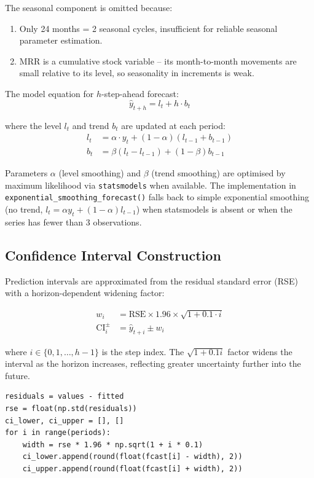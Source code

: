 The seasonal component is omitted because:
\begin{enumerate}
  \item Only 24 months = 2 seasonal cycles, insufficient for reliable seasonal parameter estimation.
  \item MRR is a cumulative stock variable -- its month-to-month movements are small relative to its level, so seasonality in increments is weak.
\end{enumerate}

The model equation for $h$-step-ahead forecast:
\begin{equation}
  \hat{y}_{t+h} = l_t + h \cdot b_t
\end{equation}

where the level $l_t$ and trend $b_t$ are updated at each period:
\begin{align}
  l_t &= \alpha \cdot y_t + (1 - \alpha)(l_{t-1} + b_{t-1}) \\
  b_t &= \beta(l_t - l_{t-1}) + (1 - \beta) b_{t-1}
\end{align}

Parameters $\alpha$ (level smoothing) and $\beta$ (trend smoothing) are optimised by maximum likelihood via \texttt{statsmodels} when available. The implementation in \texttt{exponential\_smoothing\_forecast()} falls back to simple exponential smoothing (no trend, $l_t = \alpha y_t + (1-\alpha) l_{t-1}$) when statsmodels is absent or when the series has fewer than 3 observations.

\subsection{Confidence Interval Construction}

Prediction intervals are approximated from the residual standard error (RSE) with a horizon-dependent widening factor:

\begin{align}
  w_i &= \text{RSE} \times 1.96 \times \sqrt{1 + 0.1 \cdot i} \\
  \text{CI}_{i}^{\pm} &= \hat{y}_{t+i} \pm w_i
\end{align}

where $i \in \{0, 1, \ldots, h-1\}$ is the step index. The $\sqrt{1 + 0.1i}$ factor widens the interval as the horizon increases, reflecting greater uncertainty further into the future.

\begin{lstlisting}[style=python, caption={CI construction in analytics\_engine.py.}]
residuals = values - fitted
rse = float(np.std(residuals))
ci_lower, ci_upper = [], []
for i in range(periods):
    width = rse * 1.96 * np.sqrt(1 + i * 0.1)
    ci_lower.append(round(float(fcast[i] - width), 2))
    ci_upper.append(round(float(fcast[i] + width), 2))
\end{lstlisting}

